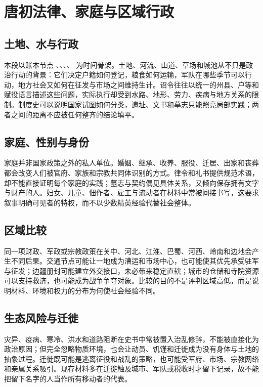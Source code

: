 \section{唐初法律、家庭与区域行政}

\subsection{土地、水与行政}

本段以账本节点 、、、、 为时间骨架。土地、河流、山道、草场和城池从不只是政治行动的背景：它们决定户籍如何登记，粮食如何运输，军队在哪些季节可以行动，地方社会又如何在征发与市场之间维持生计。诏令往往以统一的州县、户等和赋役语言描述这些问题，实际执行却受到水路、地形、劳力、疾病与地方关系的限制。制度史可以说明国家试图如何分类，遗址、文书和墓志只能照亮局部实践；两者之间的距离不应被任何整齐的结论填平。

\subsection{家庭、性别与身份}

家庭并非国家政策之外的私人单位。婚姻、继承、收养、服役、迁居、出家和丧葬都会改变人们被官府、家族和宗教共同体识别的方式。律令和礼书提供规范术语，却不能直接证明每个家庭的实践；墓志与契约偶见具体关系，又倾向保存拥有文字与财产的人。妇女、儿童、佃作者、雇工与流动者在材料中常被间接书写，这要求叙事明确可见者的特权，而不以少数精英经验代替社会整体。

\subsection{区域比较}

同一项财政、军政或宗教政策在关中、河北、江淮、巴蜀、河西、岭南和边地会产生不同后果。交通节点可能让一地成为漕运和市场中心，也可能使其优先承受驻军与征发；边疆册封可能建立外交接口，未必带来稳定直辖；城市的仓储和寺院资源可以支持救济，也可能成为战争争夺对象。比较的目的不是评判区域高低，而是说明材料、环境和权力的分布为何使社会经验不同。

\subsection{生态风险与迁徙}

灾异、疫病、寒冷、洪水和道路阻断在史书中常被置入治乱修辞，不能被直接化为政治原因；但完全忽略物质环境，也会让动员、饥馑和迁徙成为没有身体与土地的抽象过程。迁徙既可能是逃离征役和战乱的策略，也可能受军府、市场、宗教网络和亲属关系吸引。现存材料多在迁徙触及城市、军队或税收时才留下记录，故不能把留下名字的人当作所有移动者的代表。

